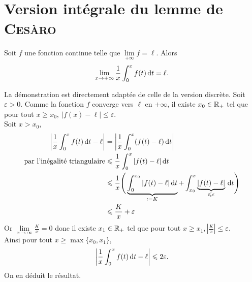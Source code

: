 \section{Version intégrale du lemme de \textsc{Cesàro}}
\begin{lemme}
    Soit $f$ une fonction continue telle que $\lim\limits_{+\infty} f = \ell$. Alors 
    $$\lim_{x \to + \infty} \frac{1}{x} \int_0^x f(t) \, \mathrm{d} t = \ell.$$
\end{lemme}

\begin{preuve}
    La démonstration est directement adaptée de celle de la version discrète. 
    Soit $\varepsilon > 0$. Comme la fonction $f$ converge vers $\ell$ en $+ \infty$, il existe $x_0 \in \mathbb{R}_+$ tel que pour tout $x \geqslant x_0,\ |f(x) - \ell| \leqslant \varepsilon$. \\
    Soit $x > x_0$,
    \begin{align*}
        \left| \frac{1}{x} \int_0^x f(t) \d t - \ell \right| &= \left| \frac{1}{x} \int_0^x (f(t) - \ell) \d t \right| \\
        \text{par l'inégalité triangulaire} &\leqslant \frac{1}{x} \int_0^x |f(t) - \ell| \d t \\
        &\leqslant \frac{1}{x} \Bigg( \underbrace{\int_{0}^{x_0} |f(t) - \ell| \d t}_{\defeq K} + \int_{x_0}^{x} \underbrace{|f(t) - \ell|}_{\leqslant \varepsilon} \d t \Bigg) \\
        &\leqslant \frac{K}{x} + \varepsilon
    \end{align*}
    Or $\lim\limits_{x \to \infty} \frac{K}{x} = 0$ donc il existe $x_1 \in \mathbb{R}_+$ tel que pour tout $x \geqslant x_1, \left| \frac{K}{x} \right| \leqslant \varepsilon$. \\
    Ainsi pour tout $x \geqslant \max \{ x_0, x_1 \}$, 
    $$\left| \frac{1}{x} \int_0^x f(t) \, \mathrm{d} t - \ell \right| \leqslant 2 \varepsilon.$$
    On en déduit le résultat. 
\end{preuve}